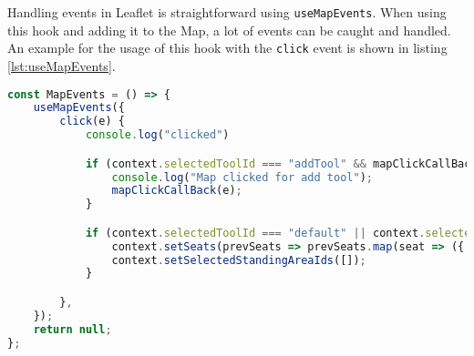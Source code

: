 Handling events in Leaflet is straightforward using \texttt{useMapEvents}. When using this hook and adding it to the Map, a lot of events can be caught and handled. An example for the usage of this hook with the \texttt{click} event is shown in listing \ref{lst:useMapEvents}.

\begin{lstlisting}[language=Typescript, caption={Handling Events in Leaflet},label={lst:useMapEvents}]
const MapEvents = () => {
    useMapEvents({
        click(e) {
            console.log("clicked")

            if (context.selectedToolId === "addTool" && mapClickCallBack) {
                console.log("Map clicked for add tool");
                mapClickCallBack(e);
            }

            if (context.selectedToolId === "default" || context.selectedToolId === "") {
                context.setSeats(prevSeats => prevSeats.map(seat => ({ ...seat, selected: false })));
                context.setSelectedStandingAreaIds([]);
            }

        },
    });
    return null;
};
\end{lstlisting}
